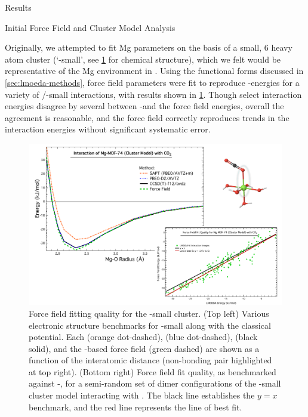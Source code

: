 \begin{section}{Results}
\label{sec:lmoeda-mgmof}

\begin{subsection}{Initial Force Field and Cluster Model Analysis}

Originally, we attempted to fit Mg parameters on the basis of a small, 6 heavy
atom cluster (`\mgmof-small', see \cref{fig:lmoeda-small_fit} for
chemical structure), which we felt would be
representative of the Mg environment in \mgmof. Using the functional forms
discussed in \cref{sec:lmoeda-methods}, force field parameters were fit to
reproduce \lmoeda-\pbeod energies for a variety of \co/\mgmof-small
interactions, with results shown in \cref{fig:lmoeda-small_fit}.
Though select interaction energies disagree by several \kjmol{} between
\lmoeda-\pbeod and the force field energies, overall the agreement is
reasonable, and the force field correctly reproduces trends in the interaction
energies without significant systematic error. 


    \begin{figure}
    \centering
    \includegraphics[width=1.0\textwidth]{lmoeda/small_energies.pdf}
    \caption[Force field fitting quality for the \mgmof-small cluster]
{Force field fitting quality for the \mgmof-small cluster. (Top left) Various
electronic structure benchmarks for \mgmof-small along with the classical
potential. Each \dftsapt (orange dot-dashed), \pbeod (blue dot-dashed), \ccsdtf (black
solid), and the \lmoeda-based force field (green dashed) are shown as a
function of the  interatomic distance (non-bonding pair highlighted
at top right). (Bottom right) Force field fit quality, as benchmarked against
\lmoeda-\pbeod, for a semi-random set of dimer configurations of the
\mgmof-small cluster model interacting with \co. The black line
establishes the $y=x$ benchmark, and the red line represents the line of best
fit.
            }
    \label{fig:lmoeda-small_fit}
    \end{figure}



\end{subsection}
\end{section}
